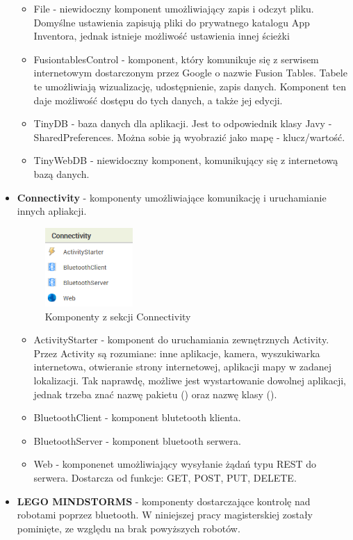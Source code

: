 \begin{itemize}
\begin{itemize}
\item File - niewidoczny komponent umożliwiający zapis i odczyt pliku. Domyślne ustawienia zapisują pliki do prywatnego katalogu App Inventora, jednak istnieje możliwość ustawienia innej ścieżki
\item FusiontablesControl - komponent, który komunikuje się z serwisem internetowym dostarczonym przez Google o nazwie Fusion Tables. Tabele te umożliwiają wizualizację, udostępnienie, zapis danych. Komponent ten daje możliwość dostępu do tych danych, a także jej edycji.
\item TinyDB - baza danych dla aplikacji. Jest to odpowiednik klasy Javy - SharedPreferences. Można sobie ją wyobrazić jako mapę - klucz/wartość.
\item TinyWebDB - niewidoczny komponent, komunikujący się z internetową bazą danych.
\end{itemize}

\item \textbf{Connectivity} - komponenty umożliwiające komunikację i uruchamianie innych apliakcji.
\begin{figure}[H] 
\centering\includegraphics[height=3cm]{figures/components/connectivity}
\caption{Komponenty z sekcji Connectivity}
\end{figure}

\begin{itemize}
\item ActivityStarter - komponent do uruchamiania zewnętrznych Activity. Przez Activity są rozumiane: inne aplikacje, kamera, wyszukiwarka internetowa, otwieranie strony internetowej, aplikacji mapy w zadanej lokalizacji. Tak naprawdę, możliwe jest wystartowanie dowolnej aplikacji, jednak trzeba znać nazwę pakietu () oraz nazwę klasy ().
\item BluetoothClient - komponent blutetooth klienta.
\item BluetoothServer - komponent bluetooth serwera.
\item Web - komponenet umożliwiający wysyłanie żądań typu REST do serwera. Dostarcza od funkcje: GET, POST, PUT, DELETE.
\end{itemize}

\item \textbf{LEGO MINDSTORMS} - komponenty dostarczające kontrolę nad robotami poprzez bluetooth. W niniejszej pracy magisterskiej zostały pominięte, ze względu na brak powyższych robotów.
\end{itemize}

